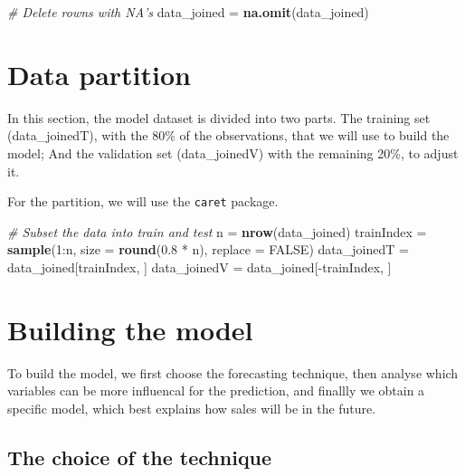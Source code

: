 \documentclass[11pt,]{article}
\newenvironment{Shaded}{\begin{snugshade}}{\end{snugshade}}
\newcommand{\KeywordTok}[1]{\textcolor[rgb]{0.13,0.29,0.53}{\textbf{{#1}}}}
\newcommand{\DataTypeTok}[1]{\textcolor[rgb]{0.13,0.29,0.53}{{#1}}}
\newcommand{\DecValTok}[1]{\textcolor[rgb]{0.00,0.00,0.81}{{#1}}}
\newcommand{\FloatTok}[1]{\textcolor[rgb]{0.00,0.00,0.81}{{#1}}}
\newcommand{\StringTok}[1]{\textcolor[rgb]{0.31,0.60,0.02}{{#1}}}
\newcommand{\CommentTok}[1]{\textcolor[rgb]{0.56,0.35,0.01}{\textit{{#1}}}}
\newcommand{\OtherTok}[1]{\textcolor[rgb]{0.56,0.35,0.01}{{#1}}}
\newcommand{\NormalTok}[1]{{#1}}
\begin{document}
\begin{Shaded}
\begin{Highlighting}[]
\CommentTok{# Delete rowns with NA's}
\NormalTok{data_joined =}\StringTok{ }\KeywordTok{na.omit}\NormalTok{(data_joined)}
\end{Highlighting}
\end{Shaded}

\section{Data partition}\label{data-partition}

In this section, the model dataset is divided into two parts. The
training set (data\_joinedT), with the 80\% of the observations, that we
will use to build the model; And the validation set (data\_joinedV) with
the remaining 20\%, to adjust it.

For the partition, we will use the \texttt{caret} package.

\begin{Shaded}
\begin{Highlighting}[]
\CommentTok{# Subset the data into train and test}
\NormalTok{n =}\StringTok{ }\KeywordTok{nrow}\NormalTok{(data_joined)}
\NormalTok{trainIndex =}\StringTok{ }\KeywordTok{sample}\NormalTok{(}\DecValTok{1}\NormalTok{:n, }\DataTypeTok{size =} \KeywordTok{round}\NormalTok{(}\FloatTok{0.8} \NormalTok{*}\StringTok{ }\NormalTok{n), }\DataTypeTok{replace =} \OtherTok{FALSE}\NormalTok{)}
\NormalTok{data_joinedT =}\StringTok{ }\NormalTok{data_joined[trainIndex, ]}
\NormalTok{data_joinedV =}\StringTok{ }\NormalTok{data_joined[-trainIndex, ]}
\end{Highlighting}
\end{Shaded}

\section{Building the model}\label{building-the-model}

To build the model, we first choose the forecasting technique, then
analyse which variables can be more influencal for the prediction, and
finallly we obtain a specific model, which best explains how sales will
be in the future.

\subsection{The choice of the
technique}\label{the-choice-of-the-technique}
\end{document}
